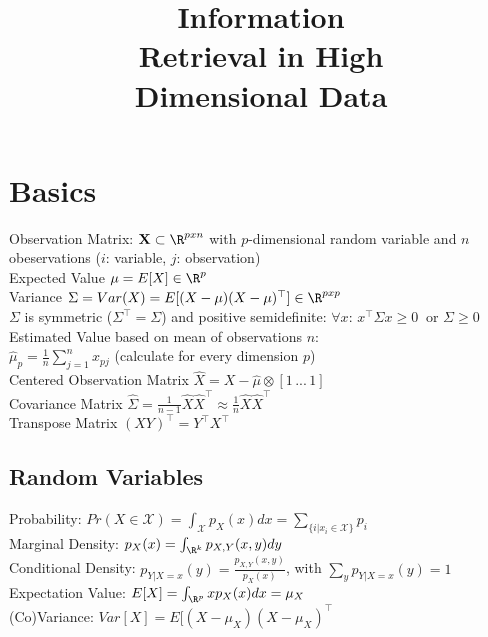 \documentclass[english]{latex4ei/latex4ei_sheet}
\title{Information \\Retrieval in High\\ Dimensional Data}
\begin{document}
\maketitle	%

\section{Basics}
\begin{sectionbox}
Observation Matrix: $\mathbf{X} \subset \R^{pxn}$ with $p$-dimensional random variable and $n$ obeservations ($i$: variable, $j$: observation)\\
Expected Value $\mu=E[X]\in\R^p$ \\
Variance $\Sigma=Var(X)=E[(X-\mu)(X-\mu)^{\top}]\in\R^{pxp}$\\
$\Sigma$ is symmetric ($\Sigma^{\top} = \Sigma$) and positive semidefinite: $\forall x$: $x^{\top}\Sigma x \ge 0\ $ or $\Sigma \ge 0$\\
Estimated Value based on mean of observations $n$: \\ $\hat{\mu}_p=\frac{1}{n}\sum_{j=1}^nx_{pj}$ (calculate for every dimension $p$)\\
Centered Observation Matrix $\hat{X}=X-\hat{\mu}\otimes [1\,...\,1]$ \\
Covariance Matrix $\hat{\Sigma}=\frac{1}{n-1}\hat{X}\hat{X}^{\top}\approx \frac{1}{n}\hat{X}\hat{X}^{\top}$ \\
Transpose Matrix $(XY)^{\top}=Y^{\top}X^{\top}$\\
\subsection{Random Variables}
Probability: $Pr(X\in\mathcal{X})=\int_\mathcal{X}p_X(x)dx=\sum_{\{i|x_i\in\mathcal{X}\}}p_i$\\
Marginal Density: $p_X(x)=\int_{\R^k}p_{X,Y}(x,y)dy$\\
Conditional Density: $p_{Y|X=x}(y)=\frac{p_{X,Y}(x,y)}{p_X(x)}$, with $\sum_{y}p_{Y|X=x}(y)=1$ \\
Expectation Value: $E[X]=\int_{\R^p}xp_X(x)dx=\mu_X$\\
(Co)Variance: $Var[X]=E[(X-\mu_X)(X-\mu_X)^{\top}$
\end{sectionbox}
\end{document}
